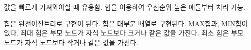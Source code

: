 값을 빠르게 가져와야할 때 유용함.
힙을 이용하여 우선순위 높은 애들부터 처리 가능.

힙은 완전이진트리로 구현이 된다. 힙은 대부분 배열로 구현된다.
MAX힙과, MIN힙이 있다.
최대 힙은 부모 노드가 자식 노드보다 크거나 같은 값을 가진다.
최소 힙은 부모 노드가 자식 노드보다 작거나 같은 값을 가진다.

